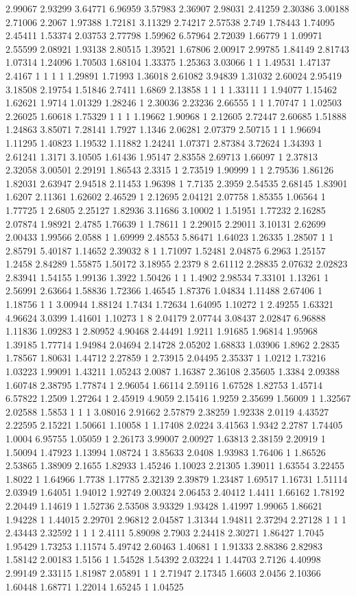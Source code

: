2.99067 2.93299 3.64771 6.96959 3.57983 2.36907 2.98031 2.41259 2.30386 3.00188 2.71006 2.2067 1.97388 1.72181 3.11329 2.74217 2.57538 2.749 1.78443 1.74095 2.45411 1.53374 2.03753 2.77798 1.59962 6.57964 2.72039 1.66779 1 1.09971 2.55599 2.08921 1.93138 2.80515 1.39521 1.67806 2.00917 2.99785 1.84149 2.81743 1.07314 1.24096 1.70503 1.68104 1.33375 1.25363 3.03066 1 1 1.49531 1.47137 2.4167 1 1 1 1 1.29891 1.71993 1.36018 2.61082 3.94839 1.31032 2.60024 2.95419 3.18508 2.19754 1.51846 2.7411 1.6869 2.13858 1 1 1 1.33111 1 1.94077 1.15462 1.62621 1.9714 1.01329 1.28246 1 2.30036 2.23236 2.66555 1 1 1.70747 1 1.02503 2.26025 1.60618 1.75329 1 1 1 1.19662 1.90968 1 2.12605 2.72447 2.60685 1.51888 1.24863 3.85071 7.28141 1.7927 1.1346 2.06281 2.07379 2.50715 1 1 1.96694 1.11295 1.40823 1.19532 1.11882 1.24241 1.07371 2.87384 3.72624 1.34393 1 2.61241 1.3171 3.10505 1.61436 1.95147 2.83558 2.69713 1.66097 1 2.37813 2.32058 3.00501 2.29191 1.86543 2.3315 1 2.73519 1.90999 1 1 2.79536 1.86126 1.82031 2.63947 2.94518 2.11453 1.96398 1 7.7135 2.3959 2.54535 2.68145 1.83901 1.6207 2.11361 1.62602 2.46529 1 2.12695 2.04121 2.07758 1.85355 1.06564 1 1.77725 1 2.6805 2.25127 1.82936 3.11686 3.10002 1 1.51951 1.77232 2.16285 2.07874 1.98921 2.4785 1.76639 1 1.78611 1 2.29015 2.29011 3.10131 2.62699 2.00433 1.99566 2.0588 1 1.69999 2.48553 5.86471 1.64023 1.26335 1.28507 1 1 2.85791 5.40187 1.14652 2.39032 8 1 1.71097 1.52481 2.04875 6.2963 1.25157 1.2458 2.84289 1.55875 1.50172 3.18955 2.2379 8 2.61112 2.28835 2.07632 2.02823 2.83941 1.54155 1.99136 1.3922 1.50426 1 1 1.4902 2.98534 7.33101 1.13261 1 2.56991 2.63664 1.58836 1.72366 1.46545 1.87376 1.04834 1.11488 2.67406 1 1.18756 1 1 3.00944 1.88124 1.7434 1.72634 1.64095 1.10272 1 2.49255 1.63321 4.96624 3.0399 1.41601 1.10273 1 8 2.04179 2.07744 3.08437 2.02847 6.96888 1.11836 1.09283 1 2.80952 4.90468 2.44491 1.9211 1.91685 1.96814 1.95968 1.39185 1.77714 1.94984 2.04694 2.14728 2.05202 1.68833 1.03906 1.8962 2.2835 1.78567 1.80631 1.44712 2.27859 1 2.73915 2.04495 2.35337 1 1.0212 1.73216 1.03223 1.99091 1.43211 1.05243 2.0087 1.16387 2.36108 2.35605 1.3384 2.09388 1.60748 2.38795 1.77874 1 2.96054 1.66114 2.59116 1.67528 1.82753 1.45714 6.57822 1.2509 1.27264 1 2.45919 4.9059 2.15416 1.9259 2.35699 1.56009 1 1.32567 2.02588 1.5853 1 1 1 3.08016 2.91662 2.57879 2.38259 1.92338 2.0119 4.43527 2.22595 2.15221 1.50661 1.10058 1 1.17408 2.0224 3.41563 1.9342 2.2787 1.74405 1.0004 6.95755 1.05059 1 2.26173 3.99007 2.00927 1.63813 2.38159 2.20919 1 1.50094 1.47923 1.13994 1.08724 1 3.85633 2.0408 1.93983 1.76406 1 1.86526 2.53865 1.38909 2.1655 1.82933 1.45246 1.10023 2.21305 1.39011 1.63554 3.22455 1.8022 1 1.64966 1.7738 1.17785 2.32139 2.39879 1.23487 1.69517 1.16731 1.51114 2.03949 1.64051 1.94012 1.92749 2.00324 2.06453 2.40412 1.4411 1.66162 1.78192 2.20449 1.14619 1 1.52736 2.53508 3.93329 1.93428 1.41997 1.99065 1.86621 1.94228 1 1.44015 2.29701 2.96812 2.04587 1.31344 1.94811 2.37294 2.27128 1 1 1 2.43443 2.32592 1 1 1 2.4111 5.89098 2.7903 2.24418 2.30271 1.86427 1.7045 1.95429 1.73253 1.11574 5.49742 2.60463 1.40681 1 1.91333 2.88386 2.82983 1.58142 2.00183 1.5156 1 1.54528 1.54392 2.03224 1 1.44703 2.7126 4.40998 2.99149 2.33115 1.81987 2.05891 1 1 2.71947 2.17345 1.6603 2.0456 2.10366 1.60448 1.68771 1.22014 1.65245 1 1.04525 